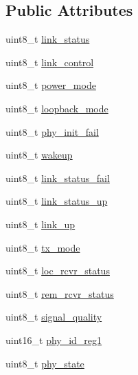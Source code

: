 \subsection*{Public Attributes}
\begin{DoxyCompactItemize}
\item 
uint8\+\_\+t \mbox{\hyperlink{structdiagnostic_data_msg_q_a1a712ef6bb1c0029592c3dbafa31a569}{link\+\_\+status}}
\item 
uint8\+\_\+t \mbox{\hyperlink{structdiagnostic_data_msg_q_a955326ea4924202ca8e42d37aec42532}{link\+\_\+control}}
\item 
uint8\+\_\+t \mbox{\hyperlink{structdiagnostic_data_msg_q_a67e41bd75ee9bd90fa84aed31f3b20ce}{power\+\_\+mode}}
\item 
uint8\+\_\+t \mbox{\hyperlink{structdiagnostic_data_msg_q_a71457503c7539ee6ca5936caf7acbcba}{loopback\+\_\+mode}}
\item 
uint8\+\_\+t \mbox{\hyperlink{structdiagnostic_data_msg_q_a598c0800fea8295ec1f61e06632e45b9}{phy\+\_\+init\+\_\+fail}}
\item 
uint8\+\_\+t \mbox{\hyperlink{structdiagnostic_data_msg_q_a1dc3ed269a7173a68e81cf00a13ed0d3}{wakeup}}
\item 
uint8\+\_\+t \mbox{\hyperlink{structdiagnostic_data_msg_q_acc605c651f6942c37e70b55dd5f44ed6}{link\+\_\+status\+\_\+fail}}
\item 
uint8\+\_\+t \mbox{\hyperlink{structdiagnostic_data_msg_q_a00ca8cdfc103ff49d8f36be6a211d272}{link\+\_\+status\+\_\+up}}
\item 
uint8\+\_\+t \mbox{\hyperlink{structdiagnostic_data_msg_q_a4c8067ddcba243b029bafb045f19e273}{link\+\_\+up}}
\item 
uint8\+\_\+t \mbox{\hyperlink{structdiagnostic_data_msg_q_abc446ab4a822dc4fba0cbb6d3f5b234c}{tx\+\_\+mode}}
\item 
uint8\+\_\+t \mbox{\hyperlink{structdiagnostic_data_msg_q_ad74c875c8d081aad08753989f143b439}{loc\+\_\+rcvr\+\_\+status}}
\item 
uint8\+\_\+t \mbox{\hyperlink{structdiagnostic_data_msg_q_a8b26cfb36423cac2f1f66ef21217f089}{rem\+\_\+rcvr\+\_\+status}}
\item 
uint8\+\_\+t \mbox{\hyperlink{structdiagnostic_data_msg_q_a2cbee01deb307a445abc8ef0dfdd56f3}{signal\+\_\+quality}}
\item 
uint16\+\_\+t \mbox{\hyperlink{structdiagnostic_data_msg_q_ad301b21bba0db0dae4edcee06ea102af}{phy\+\_\+id\+\_\+reg1}}
\item 
uint8\+\_\+t \mbox{\hyperlink{structdiagnostic_data_msg_q_a63f0f4136d1628b267af0afc1c6df9cf}{phy\+\_\+state}}

\end{DoxyCompactItemize}
